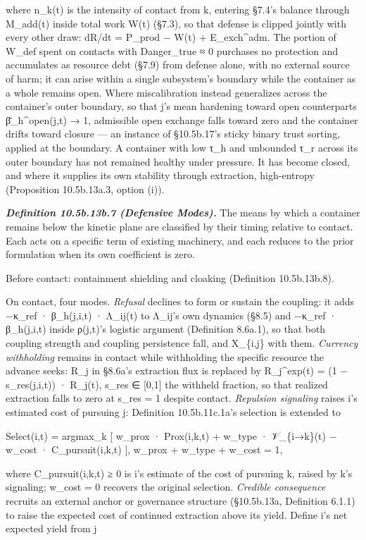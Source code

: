 \documentclass[
]{article}
\begin{document}
where n\_k(t) is the intensity of contact from k, entering §7.4's
balance through M\_add(t) inside total work W(t) (§7.3), so that defense
is clipped jointly with every other draw: dR/dt = P\_prod − W(t) +
E\_exch\^{}adm. The portion of W\_def spent on contacts with
Danger\_true ≈ 0 purchases no protection and accumulates as resource
debt (§7.9) from defense alone, with no external source of harm; it can
arise within a single subsystem's boundary while the container as a
whole remains open. Where miscalibration instead generalizes across the
container's outer boundary, so that j's mean hardening toward open
counterparts β̄\_h\^{}open(j,t) → 1, admissible open exchange falls
toward zero and the container drifts toward closure --- an instance of
§10.5b.17's sticky binary trust sorting, applied at the boundary. A
container with low τ\_h and unbounded τ\_r across its outer boundary has
not remained healthy under pressure. It has become closed, and where it
supplies its own stability through extraction, high-entropy (Proposition
10.5b.13a.3, option (i)).

\emph{\textbf{Definition 10.5b.13b.7 (Defensive Modes).}} The means by
which a container remains below the kinetic plane are classified by
their timing relative to contact. Each acts on a specific term of
existing machinery, and each reduces to the prior formulation when its
own coefficient is zero.

Before contact: containment shielding and cloaking (Definition
10.5b.13b.8).

On contact, four modes. \emph{Refusal} declines to form or sustain the
coupling: it adds −κ\_ref · β\_h(j,i,t) · Λ\_ij(t) to Λ\_ij's own
dynamics (§8.5) and −κ\_ref · β\_h(j,i,t) inside ρ(j,t)'s logistic
argument (Definition 8.6a.1), so that both coupling strength and
coupling persistence fall, and X\_\{i,j\} with them. \emph{Currency
withholding} remains in contact while withholding the specific resource
the advance seeks: R\_j in §8.6a's extraction flux is replaced by
R\_j\^{}exp(t) = (1 − s\_res(j,i,t)) · R\_j(t), s\_res ∈ {[}0,1{]} the
withheld fraction, so that realized extraction falls to zero at s\_res =
1 despite contact. \emph{Repulsion signaling} raises i's estimated cost
of pursuing j: Definition 10.5b.11c.1a's selection is extended to

Select(i,t) = argmax\_k {[} w\_prox · Prox(i,k,t) + w\_type ·
𝒱\_\{i→k\}(t) − w\_cost · C\_pursuit(i,k,t) {]}, w\_prox + w\_type +
w\_cost = 1,

where C\_pursuit(i,k,t) ≥ 0 is i's estimate of the cost of pursuing k,
raised by k's signaling; w\_cost = 0 recovers the original selection.
\emph{Credible consequence} recruits an external anchor or governance
structure (§10.5b.13a, Definition 6.1.1) to raise the expected cost of
continued extraction above its yield. Define i's net expected yield from
j
\end{document}
